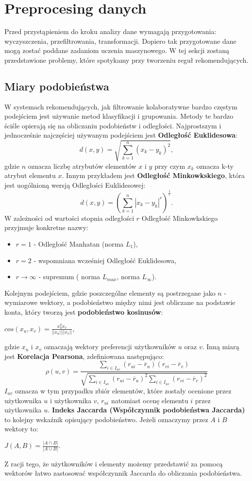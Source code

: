 \documentclass[12pt,a4paper]{report}
\begin{document}
\section{Preprocesing danych}
Przed przystąpieniem do kroku analizy dane wymagają przygotowania: wyczyszczenia, przefiltrowania, transformacji. Dopiero tak przygotowane dane mogą zostać poddane zadaniom uczenia maszynowego. W tej sekcji zostaną przedstawione problemy, które spotykamy przy tworzeniu reguł rekomendujących.
\subsection{Miary podobieństwa}
W systemach rekomendujących, jak filtrowanie kolaboratywne bardzo częstym podejściem jest używanie metod klasyfikacji i grupowania. Metody te bardzo ściśle opierają się na obliczaniu podobieństw i odległości.
Najprostszym i jednocześnie najczęściej używanym podejściem jest \textbf{Odległość Euklidesowa}:
$$
d(x,y) = \sqrt{\sum_{k=1}^n (x_k-y_k)^2},
$$ 
gdzie $n$ oznacza liczbę atrybutów elementów $x$ i $y$ przy czym $x_k$ oznacza k-ty atrybut elementu $x$. 
Innym przykładem jest \textbf{Odległość Minkowkskiego}, która jest uogólnioną wersją Odległości Euklidesowej:
$$
d(x,y) = (\sum_{k=1}^n|x_k-y_k|^r)^{\frac{1}{r}}.
$$
W zależności od wartości stopnia odległości $r$ Odległość Minkowkskiego przyjmuje konkretne nazwy:
\begin{itemize}
\item $r=1$ - Odległość Manhatan (norma $L_1$),
\item $r=2$ - wspomniana wcześniej Odległość Euklidesowa,
\item $r \longrightarrow \infty $ - supremum ( norma $L_{max}$, norma $L_{\infty}$). 
\end{itemize}
Kolejnym podejściem, gdzie poszczególne elementy są postrzegane jako $n$ - wymiarowe wektory, a podobieństwo między nimi jest obliczane na podstawie konta, który tworzą jest \textbf{podobieństwo kosinusów}:
\begin{center}
$cos(x_u, x_v) = \frac{x_u^{T}x_v}{||x_u|| ||x_v||}$,
\end{center}
gdzie $x_u$ i $x_v$ oznaczają wektory preferencji użytkowników $u$ oraz $v$.
Inną miarą jest \textbf{Korelacja Pearsona}, zdefiniowana następująco:
$$\rho(u,v) = \frac{\sum_{i\in I_{uv}}(r_{ui}-\overline{r}_u)(r_{vi}-\overline{r}_v)}{\sqrt{\sum_{i\in I_{uv}}(r_{ui}-\overline{r}_u)^2 \sum_{i\in I_{uv}}(r_{vi}-\overline{r}_v)^2}}$$
$I_{uv}$ oznacza w tym przypadku zbiór elementów, które zostały ocenione przez użytkownika $u$ i użytkownika $v$, $r_{ui}$ natomiast ocenę elementu $i$ przez użytkownika $u$.
\textbf{Indeks Jaccarda (Współczynnik podobieństwa Jaccarda)} to kolejny wskaźnik opisujący podobieństwo. Jeżeli oznaczymy przez $A$ i $B$ wektory to:
\begin{center}
$J(A,B)=\frac{|A\cap B|}{|A \cup B|}$.
\end{center}
Z racji tego, że użytkowników i elementy możemy przedstawić za pomocą wektorów łatwo zastosować współczynnik Jaccarda do obliczania podobieństwa.
\end{document}
